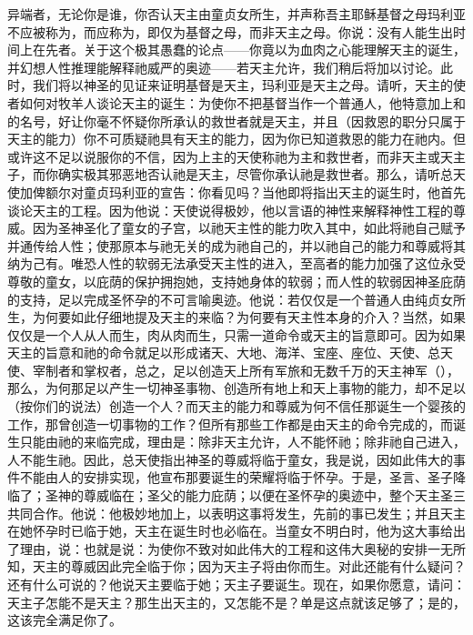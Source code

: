 异端者，无论你是谁，你否认天主由童贞女所生，并声称吾主耶稣基督之母玛利亚不应被称为，而应称为，即仅为基督之母，而非天主之母。你说：没有人能生出时间上在先者。关于这个极其愚蠢的论点——你竟以为血肉之心能理解天主的诞生，并幻想人性推理能解释祂威严的奥迹——若天主允许，我们稍后将加以讨论。此时，我们将以神圣的见证来证明基督是天主，玛利亚是天主之母。请听，天主的使者如何对牧羊人谈论天主的诞生：为使你不把基督当作一个普通人，他特意加上和的名号，好让你毫不怀疑你所承认的救世者就是天主，并且（因救恩的职分只属于天主的能力）你不可质疑祂具有天主的能力，因为你已知道救恩的能力在祂内。但或许这不足以说服你的不信，因为上主的天使称祂为主和救世者，而非天主或天主子，而你确实极其邪恶地否认祂是天主，尽管你承认祂是救世者。那么，请听总天使加俾额尔对童贞玛利亚的宣告：你看见吗？当他即将指出天主的诞生时，他首先谈论天主的工程。因为他说：天使说得极妙，他以言语的神性来解释神性工程的尊威。因为圣神圣化了童女的子宫，以祂天主性的能力吹入其中，如此将祂自己赋予并通传给人性；使那原本与祂无关的成为祂自己的，并以祂自己的能力和尊威将其纳为己有。唯恐人性的软弱无法承受天主性的进入，至高者的能力加强了这位永受尊敬的童女，以庇荫的保护拥抱她，支持她身体的软弱；而人性的软弱因神圣庇荫的支持，足以完成圣怀孕的不可言喻奥迹。他说：若仅仅是一个普通人由纯贞女所生，为何要如此仔细地提及天主的来临？为何要有天主性本身的介入？当然，如果仅仅是一个人从人而生，肉从肉而生，只需一道命令或天主的旨意即可。因为如果天主的旨意和祂的命令就足以形成诸天、大地、海洋、宝座、座位、天使、总天使、宰制者和掌权者，总之，足以创造天上所有军旅和无数千万的天主神军（），那么，为何那足以产生一切神圣事物、创造所有地上和天上事物的能力，却不足以（按你们的说法）创造一个人？而天主的能力和尊威为何不信任那诞生一个婴孩的工作，那曾创造一切事物的工作？但所有那些工作都是由天主的命令完成的，而诞生只能由祂的来临完成，理由是：除非天主允许，人不能怀祂；除非祂自己进入，人不能生祂。因此，总天使指出神圣的尊威将临于童女，我是说，因如此伟大的事件不能由人的安排实现，他宣布那要诞生的荣耀将临于怀孕。于是，圣言、圣子降临了；圣神的尊威临在；圣父的能力庇荫；以便在圣怀孕的奥迹中，整个天主圣三共同合作。他说：他极妙地加上，以表明这事将发生，先前的事已发生；并且天主在她怀孕时已临于她，天主在诞生时也必临在。当童女不明白时，他为这大事给出了理由，说：也就是说：为使你不致对如此伟大的工程和这伟大奥秘的安排一无所知，天主的尊威因此完全临于你；因为天主子将由你而生。对此还能有什么疑问？还有什么可说的？他说天主要临于她；天主子要诞生。现在，如果你愿意，请问：天主子怎能不是天主？那生出天主的，又怎能不是？单是这点就该足够了；是的，这该完全满足你了。\par

